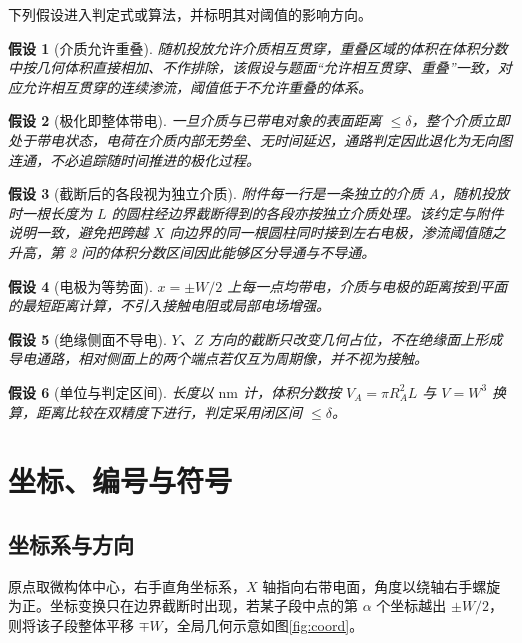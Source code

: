 \documentclass[UTF8,a4paper,zihao=-4,fontset=none]{ctexart}
\newtheorem{assumption}{假设}
\begin{document}
下列假设进入判定式或算法，并标明其对阈值的影响方向。

\begin{assumption}[介质允许重叠]
随机投放允许介质相互贯穿，重叠区域的体积在体积分数中按几何体积直接相加、不作排除，该假设与题面``允许相互贯穿、重叠''一致，对应允许相互贯穿的连续渗流，阈值低于不允许重叠的体系。
\end{assumption}

\begin{assumption}[极化即整体带电]
一旦介质与已带电对象的表面距离 $\le\delta$，整个介质立即处于带电状态，电荷在介质内部无势垒、无时间延迟，通路判定因此退化为无向图连通，不必追踪随时间推进的极化过程。
\end{assumption}

\begin{assumption}[截断后的各段视为独立介质]
附件每一行是一条独立的介质 A，随机投放时一根长度为 $L$ 的圆柱经边界截断得到的各段亦按独立介质处理。该约定与附件说明一致，避免把跨越 $X$ 向边界的同一根圆柱同时接到左右电极，渗流阈值随之升高，第 2 问的体积分数区间因此能够区分导通与不导通。
\end{assumption}

\begin{assumption}[电极为等势面]
$x=\pm W/2$ 上每一点均带电，介质与电极的距离按到平面的最短距离计算，不引入接触电阻或局部电场增强。
\end{assumption}

\begin{assumption}[绝缘侧面不导电]
$Y$、$Z$ 方向的截断只改变几何占位，不在绝缘面上形成导电通路，相对侧面上的两个端点若仅互为周期像，并不视为接触。
\end{assumption}

\begin{assumption}[单位与判定区间]
长度以 $\mathrm{nm}$ 计，体积分数按 $V_A=\pi R_A^2 L$ 与 $V=W^3$ 换算，距离比较在双精度下进行，判定采用闭区间 $\le\delta$。
\end{assumption}

\section{坐标、编号与符号}

\subsection{坐标系与方向}

原点取微构体中心，右手直角坐标系，$X$ 轴指向右带电面，角度以绕轴右手螺旋为正。坐标变换只在边界截断时出现，若某子段中点的第 $\alpha$ 个坐标越出 $\pm W/2$，则将该子段整体平移 $\mp W$，全局几何示意如图\ref{fig:coord}。
\end{document}
